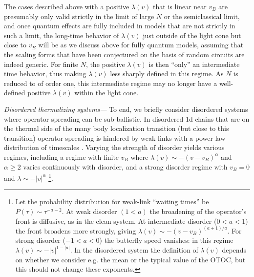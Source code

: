 \documentclass[aps,prl,reprint,superscriptaddress, longbibliography]{revtex4-1}
\begin{document}
  The cases described above with a positive $\lambda(v)$ that is linear near $v_B$ are presumably only valid strictly in the limit of large $N$ or the semiclassical limit, and once quantum effects are fully included in models that are not strictly in such a limit, the long-time behavior of $\lambda(v)$ just outside of the light cone but close to $v_B$ will be as we discuss above for fully quantum models, assuming that the scaling forms that have been conjectured on the basis of random circuits are indeed generic.  For finite $N$, the positive $\lambda(v)$ is then ``only'' an intermediate time behavior, thus making $\lambda(v)$ less sharply defined in this regime. As $N$ is reduced to of order one, this intermediate regime may no longer have a well-defined positive $\lambda(v)$ within the light cone.



\emph{Disordered thermalizing systems---} To end, we briefly consider disordered systems where operator spreading can be sub-ballistic. In disordered 1d chains that are on the thermal side of the many body localization transition (but close to this transition) operator spreading is hindered by weak links with a power-law distribution of timescales \cite{PVP, VHA, NahumRuhmanHuse}. Varying the strength of disorder yields various regimes, including a regime with finite $v_B$ where ${\lambda(v)\sim -(v-v_B)^\alpha}$ and  $\alpha\geq 2$ varies continuously with disorder, and a strong disorder regime with $v_B=0$ and $\lambda\sim - |v|^\alpha$ \footnote{Let the probability distribution for weak-link ``waiting times'' be ${P(\tau)\sim \tau^{-a-2}}$.
At weak disorder $(1<a)$ the broadening of the operator's front \cite{NahumRuhmanHuse} is diffusive, as in the clean system. At intermediate disorder (${0<a<1}$) the front broadens more strongly, giving ${\lambda(v)\sim -(v-v_B)^{(a+1)/a}}$.
For strong disorder ($-1<a<0$) the butterfly speed vanishes: in this regime ${\lambda(v)\sim - |v|^{1-|a|}}$. In the disordered system the definition of $\lambda(v)$ depends on whether we consider e.g. the mean or the typical value of the OTOC, but this should not change these exponents.}.
\end{document}
